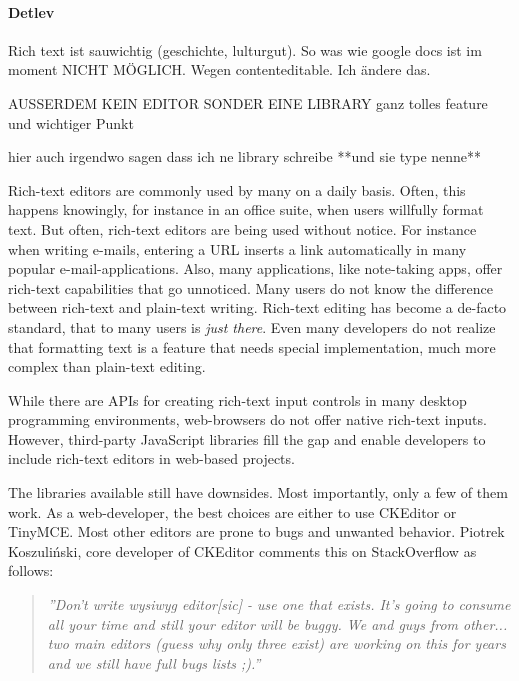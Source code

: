 \paragraph{Detlev} Rich text ist sauwichtig (geschichte, lulturgut). So was wie google docs ist im moment NICHT MÖGLICH. Wegen contenteditable. Ich ändere das.

AUSSERDEM KEIN EDITOR SONDER EINE LIBRARY ganz tolles feature und wichtiger Punkt

hier auch irgendwo sagen dass ich ne library schreibe **und sie type nenne**

Rich-text editors are commonly used by many on a daily basis. Often, this happens knowingly, for instance in an office suite, when users willfully format text. But often, rich-text editors are being used without notice. For instance when writing e-mails, entering a URL inserts a link automatically in many popular e-mail-applications. Also, many applications, like note-taking apps, offer rich-text capabilities that go unnoticed. Many users do not know the difference between rich-text and plain-text writing. Rich-text editing has become a de-facto standard, that to many users is \textit{just there}. Even many developers do not realize that formatting text is a feature that needs special implementation, much more complex than plain-text editing.

While there are APIs for creating rich-text input controls in many desktop programming environments, web-browsers do not offer native rich-text inputs. However, third-party JavaScript libraries fill the gap and enable developers to include rich-text editors in web-based projects.

The libraries available still have downsides. Most importantly, only a few of them work. As a web-developer, the best choices are either to use CKEditor or TinyMCE. Most other editors are prone to bugs and unwanted behavior. Piotrek Koszuli\'{n}ski, core developer of CKEditor comments this on StackOverflow as follows:

\begin{quotation}
\textit{''Don't write wysiwyg editor[sic] - use one that exists. It's going to consume all your time and still your editor will be buggy. We and guys from other... two main editors (guess why only three exist) are working on this for years and we still have full bugs lists ;).\cite{sopp}''}
\end{quotation} %


